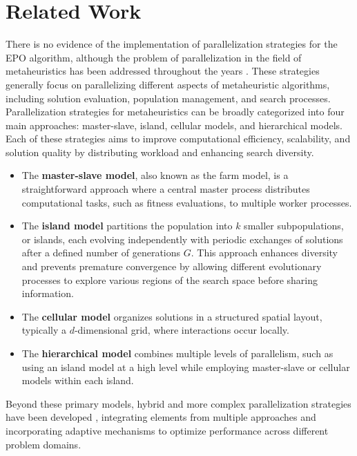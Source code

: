 \section{Related Work}

There is no evidence of the implementation of parallelization strategies for the EPO algorithm, although the problem of parallelization in the field of metaheuristics has been addressed throughout the years \cite{article}.
These strategies generally focus on parallelizing different aspects of metaheuristic algorithms, including solution evaluation, population management, and search processes.   
Parallelization strategies for metaheuristics can be broadly categorized into four main approaches: master-slave, island, cellular models, and hierarchical models. Each of these strategies aims to improve computational efficiency, scalability, and solution quality by distributing workload and enhancing search diversity.
\begin{itemize}
\item The \textbf{master-slave model}, also known as the farm model, is a straightforward approach where a central master process distributes computational tasks, such as fitness evaluations, to multiple worker processes.\newline
\item The \textbf{island model} partitions the population into $k$ smaller subpopulations, or islands, each evolving independently with periodic exchanges of solutions after a defined number of generations $G$.  This approach enhances diversity and prevents premature convergence by allowing different evolutionary processes to explore various regions of the search space before sharing information.\newline
\item The \textbf{cellular model} organizes solutions in a structured spatial layout, typically a $ d $-dimensional grid, where interactions occur locally. \newline
\item The \textbf{hierarchical model} combines multiple levels of parallelism, such as using an island model at a high level while employing master-slave or cellular models within each island. 
\end{itemize}
Beyond these primary models, hybrid and more complex parallelization strategies have been developed \cite{GONG2015286}, integrating elements from multiple approaches and incorporating adaptive mechanisms to optimize performance across different problem domains. 
